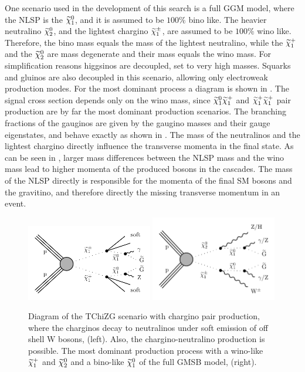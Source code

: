 One scenario used in the development of this search is a full GGM model, where the NLSP is the $\widetilde{\chi}^{0}_{1}$, and it is assumed to be $100\%$ bino like. The heavier neutralino $\widetilde{\chi}^{0}_{2}$, and the lightest chargino $\widetilde{\chi}^\pm_{1}$, are assumed to be $100\%$ wino like. Therefore, the bino mass equals the mass of the lightest neutralino, while the $\widetilde{\chi}^{+}_{1}$ and the $\widetilde{\chi}^{0}_{2}$ are mass degenerate and their mass equals the wino mass. For simplification reasons higgsinos are decoupled, \ie set to very high masses. Squarks and gluinos are also decoupled in this scenario, allowing only electroweak production modes. For the most dominant process a diagram is shown in . The signal cross section depends only on the wino mass, since $\widetilde{\chi}^{0}_{1}\widetilde{\chi}^{+}_{1}$ and $\widetilde{\chi}^{+}_{1}\widetilde{\chi}^{+}_{1}$ pair production are by far the most dominant production scenarios. The branching fractions of the gauginos are given by the gaugino masses and their gauge eigenstates, and behave exactly as shown in . The mass of the neutralinos and the lightest chargino directly influence the transverse momenta in the final state. As can be seen in , larger mass differences between the NLSP mass and the wino mass lead to higher momenta of the produced bosons in the cascades. The mass of the NLSP directly is responsible for the momenta of the final SM bosons and the gravitino, and therefore directly the missing transverse momentum in an event.\\
\begin{figure}[tbp]
 \centering
 \includegraphics[width=0.49\textwidth]{figures/signal/TChiNG}
 \includegraphics[width=0.49\textwidth]{figures/signal/gmsb}
 \caption{Diagram of the TChiZG scenario with chargino pair production, where the charginos decay to neutralinos under soft emission of off shell W bosons, (left). Also, the chargino-neutralino production is possible. The most dominant production process with a wino-like $\widetilde{\chi}^{+}_{1}$ and $\widetilde{\chi}^{0}_{2}$ and a bino-like $\widetilde{\chi}^{0}_{1}$ of the full GMSB model, (right).}
 \label{fig:ewkSMS}
\end{figure}
